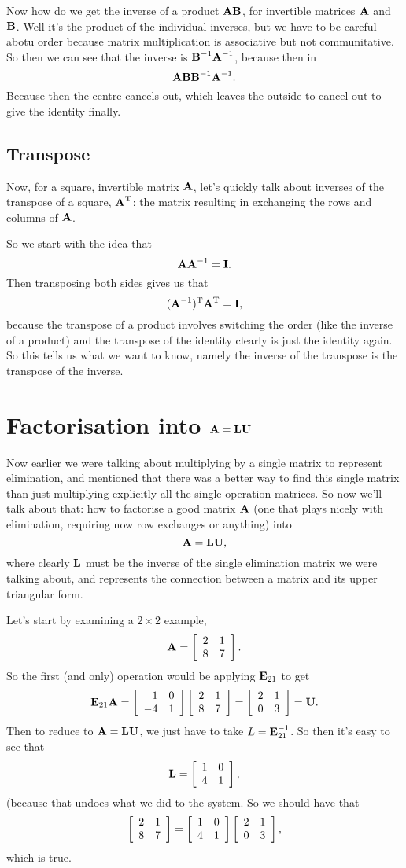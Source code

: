 Now how do we get the inverse of a product $\mA\mB$, for invertible matrices $\mA$ and $\mB$. Well it's the product of the individual inverses, but we have to be careful abotu order because matrix multiplication is associative but not communitative. So then we can see that the inverse is $\mB^{-1}\mA^{-1}$, because then in
\[ \mA\mB \mB^{-1}\mA^{-1}. \]
Because then the centre cancels out, which leaves the outside to cancel out to give the identity finally. 

\subsection{Transpose}

Now, for a square, invertible matrix $\mA$, let's quickly talk about inverses of the transpose of a square, $\T\mA$: the matrix resulting in exchanging the rows and columns of $\mA$.

So we start with the idea that
\[ \mA\mA^{-1} = \mI. \]
Then transposing both sides gives us that
\[ \T{(\mA^{-1})}\T\mA = \mI, \]
because the transpose of a product involves switching the order (like the inverse of a product) and the transpose of the identity clearly is just the identity again. So this tells us what we want to know, namely the inverse of the transpose is the transpose of the inverse.

\section{Factorisation into $\mA=\mL\mU$}

Now earlier we were talking about multiplying by a single matrix to represent elimination, and mentioned that there was a better way to find this single matrix than just multiplying explicitly all the single operation matrices. So now we'll talk about that: how to factorise a good matrix $\mA$ (one that plays nicely with elimination, requiring now row exchanges or anything) into 
\[ \mA = \mL\mU, \]
where clearly $\mL$ must be the inverse of the single elimination matrix we were talking about, and represents the connection between a matrix and its upper triangular form. 

\bex
Let's start by examining a $2\times 2$ example,
\[ \mA = \mat{2&1\\8&7}. \]
So the first (and only) operation would be applying $\mE_{21}$ to get
\[ \mE_{21}\mA = \mat{1&0\\-4&1}\mat{2&1\\8&7} = \mat{2&1\\0&3} = \mU. \]
Then to reduce to $\mA = \mL\mU$, we just have to take $L = \mE_{21}^{-1}$. So then it's easy to see that
\[ \mL = \mat{1&0\\4&1}, \]
(because that undoes what we did to the system. So we should have that
\[ \mat{2&1\\8&7} = \mat{1&0\\4&1}\mat{2&1\\0&3}, \]
which is true. 
\eex

